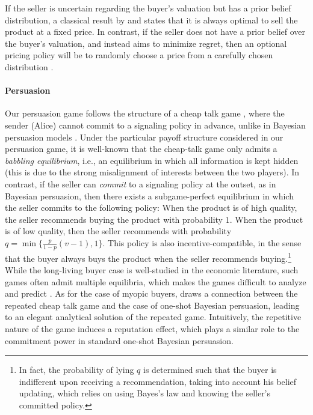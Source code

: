 If the seller is uncertain regarding the buyer's valuation but has a prior belief distribution, a classical result by \citet{harris1981theory} and \citet{riley1983optimal} states that it is always optimal to sell the product at a fixed price. In contrast, if the seller does not have a prior belief over the buyer's valuation, and instead aims to minimize regret, then an optional pricing policy will be to randomly choose a price from a carefully chosen distribution \cite{bergemann2011robust}.

\paragraph{Persuasion}

Our persuasion game follows the structure of a cheap talk game \citep{crawford1982strategic, cheaptalk}, where the sender (Alice) cannot commit to a signaling policy in advance, unlike in Bayesian persuasion models \citep{kamenica2011bayesian}. Under the particular payoff structure considered in our persuasion game, it is well-known that the cheap-talk game only admits a \emph{babbling equilibrium}, i.e., an equilibrium in which all information is kept hidden (this is due to the strong misalignment of interests between the two players). In contrast, if the seller can \emph{commit} to a signaling policy at the outset, as in Bayesian persuasion, then there exists a subgame-perfect equilibrium in which the seller commits to the following policy:
When the product is of high quality, the seller recommends buying the product with probability $1$. When the product is of low quality, then the seller recommends with probability $q = \min\{\frac{p}{1-p}(v-1),1\}$.
This policy is also incentive-compatible, in the sense that the buyer always buys the product when the seller recommends buying.\footnote{In fact, the probability of lying $q$ is determined such that the buyer is indifferent upon receiving a recommendation, taking into account his belief updating, which relies on using Bayes's law and knowing the seller's committed policy.}
While the long-living buyer case is well-studied in the economic literature, such games often admit multiple equilibria, which makes the games difficult to analyze and predict \citep{kim1996cheap,aumann2003long}.
As for the case of myopic buyers, \cite{best2024persuasion} draws a connection between the repeated cheap talk game and the case of one-shot Bayesian persuasion, leading to an elegant analytical solution of the repeated game. Intuitively, the repetitive nature of the game induces a reputation effect, which plays a similar role to the commitment power in standard one-shot Bayesian persuasion.
